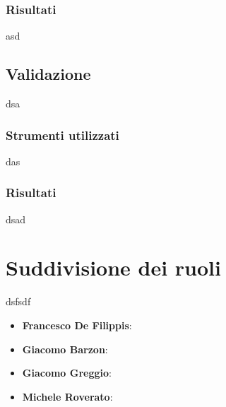 \documentclass[12pt]{article}
\begin{document}
	\subsubsection{Risultati}
	asd

	\subsection{Validazione}
	dsa
	\subsubsection{Strumenti utilizzati}
	das
	\subsubsection{Risultati}
	dsad
	
	\section{Suddivisione dei ruoli}
	dsfsdf
	\begin{itemize}
		\item \textbf{Francesco De Filippis}: 
		\item \textbf{Giacomo Barzon}:
		\item \textbf{Giacomo Greggio}:
		\item \textbf{Michele Roverato}:
	\end{itemize}
\end{document}

